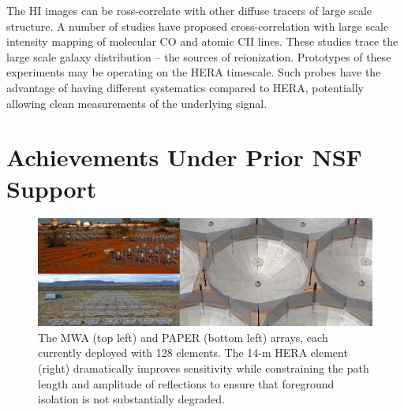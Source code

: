 \documentclass[preprint]{aastex}
\begin{document}
The HI images can be ross-correlate with other diffuse 
tracers of large scale structure.  A number of studies have proposed cross-correlation with large scale intensity
mapping of molecular  CO \cite{lidz_et_al2011} and atomic CII \citep{gong_et_al2011} lines. These studies
trace the large scale galaxy distribution -- the sources of reionization. 
Prototypes of these experiments 
may be operating on the HERA timescale.  Such probes have the advantage of having different systematics 
compared to HERA, potentially allowing clean measurements of the underlying signal.



\section{Achievements Under Prior NSF Support} %
\label{sec:Lessons}

\begin{figure}[t]\centering
\includegraphics[width=6.5in]{plots/PAPER_and_MWA_and_HERA.jpg}
\caption{\small
The MWA (top left) and PAPER (bottom left) arrays, each currently deployed with 128 elements.
The 14-m HERA element (right) dramatically improves sensitivity while 
constraining the path length and amplitude of reflections to ensure that foreground
isolation is not substantially degraded.
}
\label{fig:hera_dish}
\end{figure}
\end{document}
